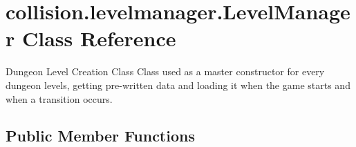 \hypertarget{classcollision_1_1levelmanager_1_1_level_manager}{}\section{collision.\+levelmanager.\+Level\+Manager Class Reference}
\label{classcollision_1_1levelmanager_1_1_level_manager}


Dungeon Level Creation Class  Class used as a master constructor for every dungeon levels, getting pre-\/written data and loading it when the game starts and when a transition occurs.  


\subsection*{Public Member Functions}
